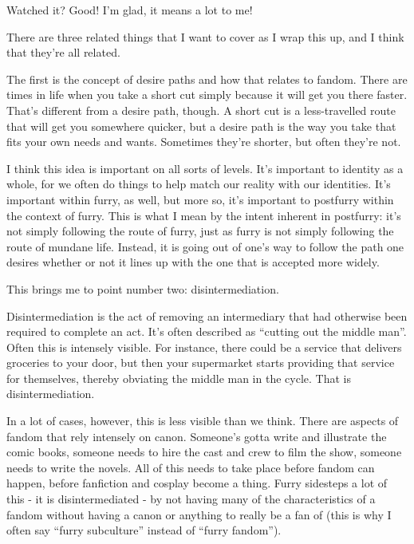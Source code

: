 Watched it?{ }Good!{ }I'm glad, it means a lot to me!

There are three related things that I want to cover as I wrap this up, and I think that they're all related.

The first is the concept of desire paths and how that relates to fandom.{ }There are times in life when you take a short cut simply because it will get you there faster.{ }That's different from a desire path, though.{ }A short cut is a less-travelled route that will get you somewhere quicker, but a desire path is the way you take that fits your own needs and wants.{ }Sometimes they're shorter, but often they're not.

I think this idea is important on all sorts of levels.{ }It's important to identity as a whole, for we often do things to help match our reality with our identities.{ }It's important within furry, as well, but more so, it's important to postfurry within the context of furry.{ }This is what I mean by the intent inherent in postfurry: it's not simply following the route of furry, just as furry is not simply following the route of mundane life.{ }Instead, it is going out of one's way to follow the path one desires whether or not it lines up with the one that is accepted more widely.

This brings me to point number two: disintermediation.

Disintermediation is the act of removing an intermediary that had otherwise been required to complete an act.{ }It's often described as ``cutting out the middle man''.{ }Often this is intensely visible.{ }For instance, there could be a service that delivers groceries to your door, but then your supermarket starts providing that service for themselves, thereby obviating the middle man in the cycle.{ }That is disintermediation.

In a lot of cases, however, this is less visible than we think.{ }There are aspects of fandom that rely intensely on canon.{ }Someone's gotta write and illustrate the comic books, someone needs to hire the cast and crew to film the show, someone needs to write the novels.{ }All of this needs to take place before fandom can happen, before fanfiction and cosplay become a thing.{ }Furry sidesteps a lot of this - it is disintermediated - by not having many of the characteristics of a fandom without having a canon or anything to really be a fan of (this is why I often say ``furry subculture'' instead of ``furry fandom'').

